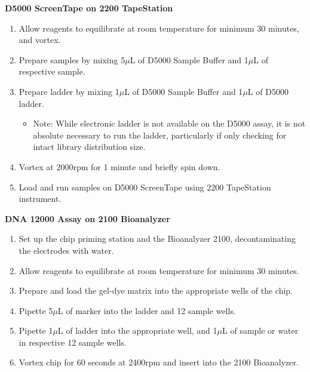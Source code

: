 \textbf{D5000 ScreenTape on 2200 TapeStation}
\begin{enumerate}
	\item Allow reagents to equilibrate at room temperature for minimum 30 minutes, and vortex.
	\item Prepare samples by mixing 5$\mu$L of D5000 Sample Buffer and 1$\mu$L of respective sample.
	\item Prepare ladder by mixing 1$\mu$L of D5000 Sample Buffer and 1$\mu$L of D5000 ladder.
	\begin{itemize}
		\item Note: While electronic ladder is not available on the D5000 assay, it is not absolute necessary to run the ladder, particularly if only checking for intact library distribution size.
	\end{itemize} 
	\item Vortex at 2000rpm for 1 minute and briefly spin down.
	\item Load and run samples on D5000 ScreenTape using 2200 TapeStation instrument. 	
\end{enumerate}

\vspace{0.5cm}
\textbf{DNA 12000 Assay on 2100 Bioanalyzer}
\begin{enumerate}
	\item Set up the chip priming station and the Bioanalyzer 2100, decontaminating the electrodes with water.
	\item Allow reagents to equilibrate at room temperature for minimum 30 minutes.
	\item Prepare and load the gel-dye matrix into the appropriate wells of the chip. 
	\item Pipette 5$\mu$L of marker into the ladder and 12 sample wells. 
	\item Pipette 1$\mu$L of ladder into the appropriate well, and 1$\mu$L of sample or water in respective 12 sample wells.
	\item Vortex chip for 60 seconds at 2400rpm and insert into the 2100 Bioanalyzer.
\end{enumerate} 

